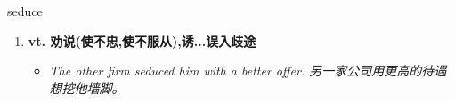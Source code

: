 
\begin{frame}
{\huge seduce}
\begin{center}
\begin{enumerate}\Large
  \item \textbf{vt. 劝说(使不忠,使不服从),诱...误入歧途}
  \begin{itemize}
    \item \em{\Large{The other firm seduced him with a better offer. 另一家公司用更高的待遇想挖他墙脚。}}
  \end{itemize}
\end{enumerate}
\end{center}
\end{frame}
